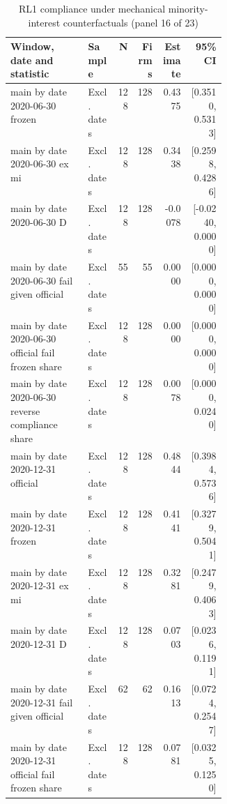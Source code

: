 \begin{table}[!htbp]\centering\scriptsize
\caption{RL1 compliance under mechanical minority-interest counterfactuals (panel 16 of 23)}
\begin{threeparttable}
\begin{tabular}{p{0.36\linewidth}lrrrr}
\toprule
Window, date and statistic & Sample & N & Firms & Estimate & 95\% CI \\
\midrule
main by date 2020-06-30 frozen & Excl. dates & 128 & 128 & 0.4375 & [0.3510, 0.5313] \\
main by date 2020-06-30 ex mi & Excl. dates & 128 & 128 & 0.3438 & [0.2598, 0.4286] \\
main by date 2020-06-30 D & Excl. dates & 128 & 128 & -0.0078 & [-0.0240, 0.0000] \\
main by date 2020-06-30 fail given official & Excl. dates & 55 & 55 & 0.0000 & [0.0000, 0.0000] \\
main by date 2020-06-30 official fail frozen share & Excl. dates & 128 & 128 & 0.0000 & [0.0000, 0.0000] \\
main by date 2020-06-30 reverse compliance share & Excl. dates & 128 & 128 & 0.0078 & [0.0000, 0.0240] \\
main by date 2020-12-31 official & Excl. dates & 128 & 128 & 0.4844 & [0.3984, 0.5736] \\
main by date 2020-12-31 frozen & Excl. dates & 128 & 128 & 0.4141 & [0.3279, 0.5041] \\
main by date 2020-12-31 ex mi & Excl. dates & 128 & 128 & 0.3281 & [0.2479, 0.4063] \\
main by date 2020-12-31 D & Excl. dates & 128 & 128 & 0.0703 & [0.0236, 0.1191] \\
main by date 2020-12-31 fail given official & Excl. dates & 62 & 62 & 0.1613 & [0.0724, 0.2547] \\
main by date 2020-12-31 official fail frozen share & Excl. dates & 128 & 128 & 0.0781 & [0.0325, 0.1250] \\
\bottomrule
\end{tabular}
\begin{tablenotes}[flushleft]\footnotesize

\end{tablenotes}
\end{threeparttable}
\end{table}
